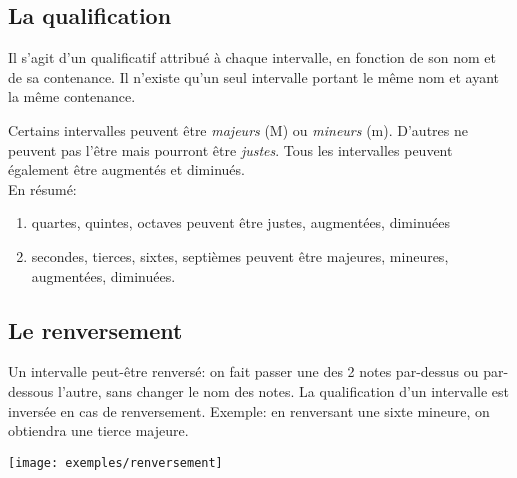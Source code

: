 \subsection{La qualification}
Il s'agit d'un qualificatif attribué à chaque intervalle, en fonction de son nom et de sa contenance. Il n'existe qu'un seul intervalle portant le même nom et ayant la même contenance.

Certains intervalles peuvent être \emph{majeurs} (M) ou \emph{mineurs} (m). D'autres ne peuvent pas l'être mais pourront être \emph{justes}. Tous les intervalles peuvent également être augmentés et diminués.\\


En résumé:
\begin{enumerate}
\item quartes, quintes, octaves peuvent être justes, augmentées, diminuées
\item secondes, tierces, sixtes, septièmes peuvent être majeures, mineures, augmentées, diminuées.
\end{enumerate}

\subsection{Le renversement}
Un intervalle peut-être renversé: on fait passer une des 2 notes par-dessus ou par-dessous l'autre, sans changer le nom des notes. La qualification d'un intervalle est inversée en cas de renversement. Exemple: en renversant une sixte mineure, on obtiendra une tierce majeure.

\centerline{\texttt{[image: exemples/renversement]}}


